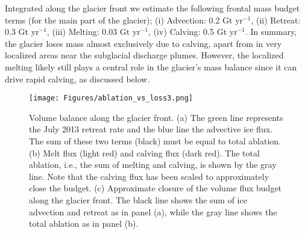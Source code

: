 \documentclass[10pt,letterpaper]{article}
\begin{document}
Integrated along the glacier front we estimate the following frontal mass budget terms (for the main part of the glacier); (i) Advection: 0.2 Gt yr$^{-1}$, (ii) Retreat: 0.3 Gt yr$^{-1}$, (iii) Melting: 0.03 Gt yr$^{-1}$, (iv) Calving: 0.5  Gt yr$^{-1}$. In summary, the glacier loses mass almost exclusively due to calving, apart from in very localized areas near the subglacial discharge plumes. However, the localized melting likely still plays a central role in the glacier's mass balance since it can drive rapid calving, as discussed below. 
 
%
% 
% 
% 
%


   \begin{figure*}[ht!]
 \begin{center}
  \texttt{[image: Figures/ablation\_vs\_loss3.png]}
  \caption{Volume balance along the glacier front. (a) The green line represents the July 2013 retreat rate and the blue line the advective ice flux. The sum of these two terms (black) must be equal to total ablation. (b) Melt flux (light red) and calving flux (dark red). The total ablation, i.e., the sum of melting and calving, is shown by the gray line. Note that the calving flux has been scaled to approximately close the budget. (c) Approximate closure of the volume flux budget along the glacier front. The black line shows the sum of ice advection and retreat as in panel (a), while the gray line shows the total ablation as in panel (b).
}
   \label{fig:ablation}
  \end{center}
\end{figure*}


\end{document}
